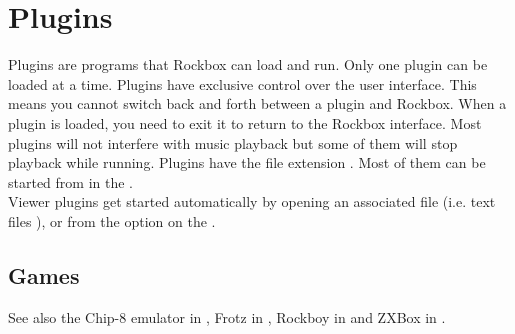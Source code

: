 \chapter{Plugins}\label{ref:plugins}
Plugins are programs that Rockbox can load and run. Only one plugin can
be loaded at a time. Plugins have exclusive control over the user interface.
This means you cannot switch back and forth between a plugin and Rockbox. When
a plugin is loaded, you need to exit it to return to the Rockbox interface.
Most plugins will not interfere with music playback but some of them will stop
playback while running. Plugins have the file extension . Most of
them can be started from  in the .\\

Viewer plugins get started automatically by opening an associated file (i.e.
text files%
%
), or from the  option on the .

\section{Games}
    {See also the Chip{}-8 emulator in ,
    Frotz in ,
    {Rockboy in }
    and ZXBox in .}










{}


